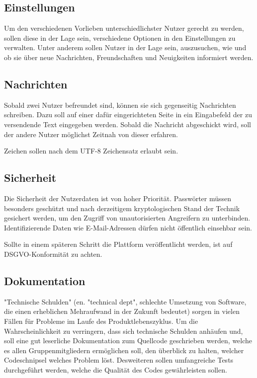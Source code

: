 \subsection{Einstellungen}
Um den verschiedenen Vorlieben unterschiedlichster Nutzer gerecht zu werden, sollen diese in der Lage sein, verschiedene Optionen in den Einstellungen zu verwalten. Unter anderem sollen Nutzer in der Lage sein, auszusuchen, wie und ob sie über neue Nachrichten, Freundschaften und Neuigkeiten informiert werden.

\subsection{Nachrichten}
Sobald zwei Nutzer befreundet sind, können sie sich gegenseitig Nachrichten schreiben. Dazu soll auf einer dafür eingerichteten Seite in ein Eingabefeld der zu versendende Text eingegeben werden. Sobald die Nachricht abgeschickt wird, soll der andere Nutzer möglichst Zeitnah von dieser erfahren. 

Zeichen sollen nach dem UTF-8 Zeichensatz erlaubt sein.

\subsection{Sicherheit}
Die Sicherheit der Nutzerdaten ist von hoher Priorität. Passwörter müssen besonders geschützt und nach derzeitigem kryptologischen Stand der Technik gesichert werden, um den Zugriff von unautorisierten Angreifern zu unterbinden. Identifizierende Daten wie E-Mail-Adressen dürfen nicht öffentlich einsehbar sein.

Sollte in einem späteren Schritt die Plattform veröffentlicht werden, ist auf DSGVO-Konformität zu achten.

\subsection{Dokumentation}
"Technische Schulden" (en. "technical dept", schlechte Umsetzung von Software, die einen erheblichen Mehraufwand in der Zukunft bedeutet) sorgen in vielen Fällen für Probleme im Laufe des Produktlebenszyklus. Um die Wahrscheinlichkeit zu verringern, dass sich technische Schulden anhäufen und, soll eine gut leserliche Dokumentation zum Quellcode geschrieben werden, welche es allen Gruppenmitgliedern ermöglichen soll, den überblick zu halten, welcher Codeschnipsel welches Problem löst. Desweiteren sollen umfangreiche Tests durchgeführt werden, welche die Qualität des Codes gewährleisten sollen.

